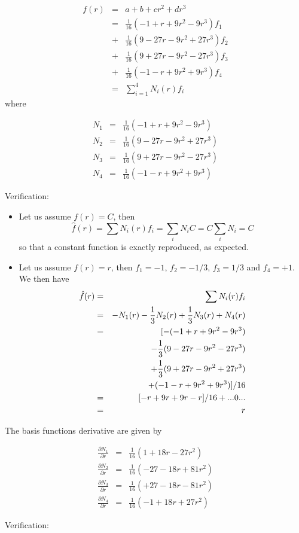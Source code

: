 \begin{eqnarray}
f(r) 
&=& a+b+cr^2+dr^3 \nonumber\\
&=& \frac{1}{16} (-1+  r +9r^2 - 9r^3 )f_1 \nonumber\\ 
&+& \frac{1}{16} ( 9-27r -9r^2 +27r^3 )f_2 \nonumber\\ 
&+& \frac{1}{16} ( 9+27r -9r^2 -27r^3 )f_3 \nonumber\\ 
&+& \frac{1}{16} (-1-  r +9r^2 + 9r^3 )f_4 \nonumber\\ 
&=& \sum_{i=1}^4 N_i(r) f_i \nonumber
\end{eqnarray}
where
\begin{mdframed}[backgroundcolor=blue!5]
\begin{eqnarray}
N_1&=& \frac{1}{16} (-1+  r+9r^2- 9r^3 ) \nonumber\\ 
N_2&=& \frac{1}{16} ( 9-27r-9r^2+27r^3 ) \nonumber\\ 
N_3&=& \frac{1}{16} ( 9+27r-9r^2-27r^3 ) \nonumber\\ 
N_4&=& \frac{1}{16} (-1-  r+9r^2+ 9r^3 ) \nonumber
\end{eqnarray}
\end{mdframed}
Verification:

\begin{itemize}
\item
Let us assume $f(r)=C$, then
\[
\hat{f}(r) = \sum N_i(r) f_i = \sum_i N_i C = C \sum_i N_i  = C
\]
so that a constant function is exactly reproduced, as expected.

\item
Let us assume $f(r)= r$, then $f_1=-1$, $f_2=-1/3$, $f_3=1/3$ and $f_4=+1$. We then have
\begin{eqnarray}
\hat{f}(r) 
&=& \sum N_i(r) f_i  \nonumber\\
&=& - N_1(r) -\frac{1}{3}N_2(r) + \frac{1}{3}N_3(r)  + N_4(r) \nonumber\\
&=& [-(-1+  r+9r^2- 9r^3 ) \nonumber\\
&&- \frac{1}{3} ( 9-27r-9r^2-27r^3 ) \nonumber\\
&&+ \frac{1}{3} ( 9+27r-9r^2+27r^3 ) \nonumber\\
&&+ (-1-  r+9r^2+ 9r^3 )]/16 \nonumber\\
&=& [-r +9r + 9r -r]/16  + ... 0 ... \nonumber\\
&=& r   
\end{eqnarray}

\end{itemize}


The basis functions derivative are given by
\begin{mdframed}[backgroundcolor=blue!5]
\begin{eqnarray}
 \frac{\partial N_1}{\partial r}&=& \frac{1}{16}  (  1 +18r - 27r^2 ) \nonumber\\ 
 \frac{\partial N_2}{\partial r}&=& \frac{1}{16}  (-27 -18r + 81r^2 ) \nonumber\\ 
 \frac{\partial N_3}{\partial r}&=& \frac{1}{16}  (+27 -18r - 81r^2 ) \nonumber\\ 
 \frac{\partial N_4}{\partial r}&=& \frac{1}{16}  ( -1 +18r + 27r^2 ) \nonumber
\end{eqnarray}
\end{mdframed}
Verification:

